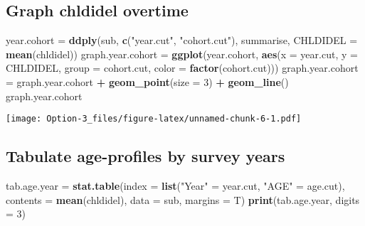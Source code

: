 \documentclass[]{article}
\newenvironment{Shaded}{\begin{snugshade}}{\end{snugshade}}
\newcommand{\DataTypeTok}[1]{\textcolor[rgb]{0.13,0.29,0.53}{#1}}
\newcommand{\DecValTok}[1]{\textcolor[rgb]{0.00,0.00,0.81}{#1}}
\newcommand{\KeywordTok}[1]{\textcolor[rgb]{0.13,0.29,0.53}{\textbf{#1}}}
\newcommand{\NormalTok}[1]{#1}
\newcommand{\OperatorTok}[1]{\textcolor[rgb]{0.81,0.36,0.00}{\textbf{#1}}}
\newcommand{\StringTok}[1]{\textcolor[rgb]{0.31,0.60,0.02}{#1}}
\begin{document}
\hypertarget{graph-chldidel-overtime}{%
\subsection{Graph chldidel overtime}\label{graph-chldidel-overtime}}

\begin{Shaded}
\begin{Highlighting}[]
\NormalTok{year.cohort =}\StringTok{ }\KeywordTok{ddply}\NormalTok{(sub, }\KeywordTok{c}\NormalTok{(}\StringTok{"year.cut"}\NormalTok{, }\StringTok{"cohort.cut"}\NormalTok{), summarise, }\DataTypeTok{CHLDIDEL =} \KeywordTok{mean}\NormalTok{(chldidel))}
\NormalTok{graph.year.cohort =}\StringTok{ }\KeywordTok{ggplot}\NormalTok{(year.cohort, }\KeywordTok{aes}\NormalTok{(}\DataTypeTok{x =}\NormalTok{ year.cut, }\DataTypeTok{y =}\NormalTok{ CHLDIDEL, }\DataTypeTok{group =}\NormalTok{ cohort.cut, }\DataTypeTok{color =} \KeywordTok{factor}\NormalTok{(cohort.cut)))}
\NormalTok{graph.year.cohort =}\StringTok{ }\NormalTok{graph.year.cohort }\OperatorTok{+}\StringTok{ }\KeywordTok{geom_point}\NormalTok{(}\DataTypeTok{size =} \DecValTok{3}\NormalTok{) }\OperatorTok{+}\StringTok{ }\KeywordTok{geom_line}\NormalTok{()}
\NormalTok{graph.year.cohort}
\end{Highlighting}
\end{Shaded}

\texttt{[image: Option-3\_files/figure-latex/unnamed-chunk-6-1.pdf]}

\hypertarget{tabulate-age-profiles-by-survey-years}{%
\subsection{Tabulate age-profiles by survey
years}\label{tabulate-age-profiles-by-survey-years}}

\begin{Shaded}
\begin{Highlighting}[]
\NormalTok{tab.age.year =}\StringTok{ }\KeywordTok{stat.table}\NormalTok{(}\DataTypeTok{index =} \KeywordTok{list}\NormalTok{(}\StringTok{"Year"}\NormalTok{ =}\StringTok{ }\NormalTok{year.cut, }\StringTok{"AGE"}\NormalTok{ =}\StringTok{ }\NormalTok{age.cut),}
                             \DataTypeTok{contents =} \KeywordTok{mean}\NormalTok{(chldidel),}
                             \DataTypeTok{data =}\NormalTok{ sub,}
                             \DataTypeTok{margins =}\NormalTok{ T)}
\KeywordTok{print}\NormalTok{(tab.age.year, }\DataTypeTok{digits =} \DecValTok{3}\NormalTok{)}
\end{Highlighting}
\end{Shaded}
\end{document}
